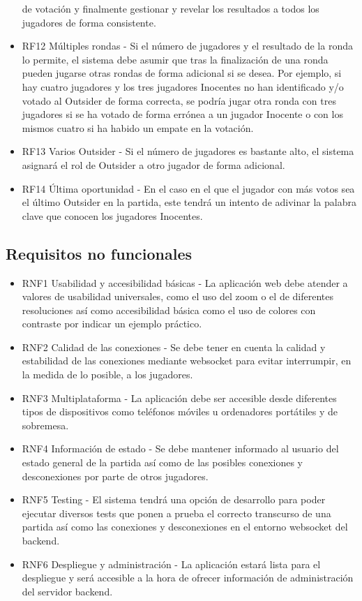 \begin{itemize}
	      de votación y finalmente gestionar y revelar los resultados a todos los jugadores de forma consistente.
	\item RF12 Múltiples rondas - Si el número de jugadores  y el resultado de la ronda lo permite, el sistema debe asumir que tras
	      la finalización de una ronda pueden jugarse otras rondas de forma adicional si se desea. Por ejemplo, si hay cuatro jugadores y los tres jugadores
	      Inocentes no han identificado y/o votado al Outsider de forma correcta, se podría jugar otra ronda con tres jugadores si se ha votado de forma
	      errónea a un jugador Inocente o con los mismos cuatro si ha habido un empate en la votación.
	\item RF13 Varios Outsider - Si el número de jugadores es bastante alto, el sistema asignará el rol de Outsider a otro jugador de forma adicional.
	\item RF14 Última oportunidad - En el caso en el que el jugador con más votos sea el último Outsider en la partida, este tendrá un intento de
	      adivinar la palabra clave que conocen los jugadores Inocentes.
\end{itemize}

\subsection{Requisitos no funcionales}

\begin{itemize}
	\item RNF1 Usabilidad y accesibilidad básicas - La aplicación web debe atender a valores de usabilidad universales, como el uso del zoom o
	      el de diferentes resoluciones así como accesibilidad básica como el uso de colores con contraste por indicar un ejemplo práctico.
	\item RNF2 Calidad de las conexiones - Se debe tener en cuenta la calidad y estabilidad de las conexiones mediante websocket para evitar
	      interrumpir, en la medida de lo posible, a los jugadores.
	\item RNF3 Multiplataforma - La aplicación debe ser accesible desde diferentes tipos de dispositivos como teléfonos móviles u ordenadores portátiles
	      y de sobremesa.
	\item RNF4 Información de estado - Se debe mantener informado al usuario del estado general de la partida así como de las posibles conexiones y desconexiones
	      por parte de otros jugadores.
	\item RNF5 Testing - El sistema tendrá una opción de desarrollo para poder ejecutar diversos tests que ponen
	      a prueba el correcto transcurso de una partida así como las conexiones y desconexiones en el entorno websocket del backend.
	\item RNF6 Despliegue y administración - La aplicación estará lista para el despliegue y será accesible a la hora de ofrecer información de administración del servidor
	      backend.
\end{itemize}

